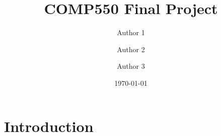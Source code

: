 \documentclass{article}
\title{COMP550 Final Project}
\author[1]{Author 1}
\author[1]{Author 2}
\author[1]{Author 3}
\affil[1]{McGill University}
\date{\today}
\begin{document}
\maketitle
\tableofcontents

\section{Introduction}
\end{document}
